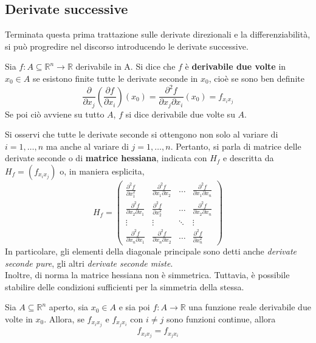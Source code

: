\subsection{Derivate successive}
Terminata questa prima trattazione sulle derivate direzionali e la differenziabilità, si può progredire nel discorso introducendo le derivate successive.\\
\begin{definition}
    Sia $f:A \subseteq \mathbb{R}^n \to \mathbb{R}$ derivabile in A. Si dice che $f$ è \textbf{derivabile due volte} in $x_0 \in A$ se esistono finite tutte le derivate seconde in $x_0$, cioè se sono ben definite
    \begin{equation}
        \frac{\partial}{\partial x_j}\left(\frac{\partial f}{\partial x_i}\right)(x_0)=\frac{\partial^2f}{\partial x_j \partial x_i}(x_0)=f_{x_ix_j}
    \end{equation}
    Se poi ciò avviene su tutto $A$, $f$ si dice derivabile due volte su $A$.
\end{definition}
Si osservi che tutte le derivate seconde si ottengono non solo al variare di $i=1, \dots, n$ ma anche al variare di $j=1, \dots, n$. Pertanto, si parla di matrice delle derivate seconde o di \textbf{matrice hessiana}, indicata con $H_f$ e descritta da $H_f=(f_{x_ix_j})$ o, in maniera esplicita,
\begin{equation} \label{Eq: Matrice hessiana}
   H_f = \begin{pmatrix}
    \frac{\partial^2 f}{\partial x_1^2} & \frac{\partial^2 f}{\partial x_1 \partial x_2} & \dots  & \frac{\partial^2 f}{\partial x_1 \partial x_n} \\
    \frac{\partial^2 f}{\partial x_2 \partial x_1} & \frac{\partial^2 f}{\partial x_2^2}  & \dots  & \frac{\partial^2 f}{\partial x_2 \partial x_n} \\
    \vdots & \vdots & \ddots & \vdots \\
    \frac{\partial^2 f}{\partial x_n \partial x_1} & \frac{\partial^2 f}{\partial x_n \partial x_2} & \dots  & \frac{\partial^2 f}{\partial x_n^2}
    \end{pmatrix}
\end{equation}
In particolare, gli elementi della diagonale principale sono detti anche \textit{derivate seconde pure}, gli altri \textit{derivate seconde miste}.\\
Inoltre, di norma la matrice hessiana non è simmetrica. Tuttavia, è possibile stabilire delle condizioni sufficienti per la simmetria della stessa.
\begin{theorem} \label{Teo: Schwarz}
    Sia $A \subseteq \mathbb{R}^n$ aperto, sia $x_0 \in A$ e sia poi $f: A \to \mathbb{R}$ una funzione reale derivabile due volte in $x_0$. Allora, se $f_{x_ix_j}$ e $f_{x_jx_i}$ con $i \neq j$ sono funzioni continue, allora 
    \begin{equation}
        f_{x_ix_j}=f_{x_jx_i}
    \end{equation}
\end{theorem}
